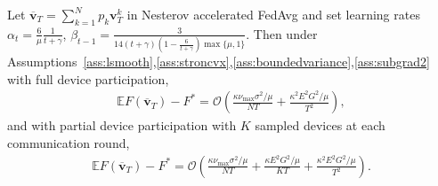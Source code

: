 \begin{thm}
	Let $\overline{\mathbf{v}}_{T}=\sum_{k=1}^{N}p_{k}\mathbf{v}_{T}^{k}$ in Nesterov accelerated FedAvg
	and set learning rates $\alpha_{t}=\frac{6}{\mu}\frac{1}{t+\gamma}$,  $\beta_{t-1}=\frac{3}{14(t+\gamma)(1-\frac{6}{t+\gamma})\max\{\mu,1\}}$. Then under Assumptions~\ref{ass:lsmooth},\ref{ass:stroncvx},\ref{ass:boundedvariance},\ref{ass:subgrad2} with full device participation, 
	\begin{align*}
	\mathbb{E}F(\overline{\mathbf{v}}_{T})-F^{\ast}=\mathcal{O}\left(\frac{\kappa\nu_{\max}\sigma^{2}/\mu}{NT}+\frac{\kappa^{2}E^{2}G^{2}/\mu}{T^{2}}\right),
	\end{align*}
	and with partial device participation with $K$ sampled devices at
	each communication round, 
	{\small
	\begin{align*}
	\mathbb{E}F(\overline{\mathbf{v}}_{T})-F^{\ast}=\mathcal{O}\left(\frac{\kappa\nu_{\max}\sigma^{2}/\mu}{NT}+\frac{\kappa E^{2}G^{2}/\mu}{KT}+\frac{\kappa^{2}E^{2}G^{2}/\mu}{T^{2}}\right).
	\end{align*}}
\end{thm}
%
%
\textbf{}%
\begin{comment}
This implies that $E$ canot be chosen $O(T^{\beta})$ for any $\beta>0$
without degrading the performance. This should be checked in experiments,
whether with partial participation if the communication round is set
to scale with $T$, the convergence deteriorates. This is in constrast
with the full participation case, where $E=O(\sqrt{\frac{T}{N}})$
is allowed. \textbf{If we can confirm that full participation allows
linear speedup with $\nu=N\cdot\max_{k}p_{k}\approx1$ and $E=O(\sqrt{\frac{T}{N}})$,
whereas partial participation only allows $E=O(1)$, then this would
an interesting phenomenon that is not reported by previous studies!}

The convergence result implies that with fixed $E$, as long as \$N\$
satisfies \$E=O(\textbackslash sqrt\{T/N\})\$, there is linear speedup.
When \$N\$ exceeds an upper bound, however, linear speedup may fail
to happen, and \$T/N\$ may remain constant, i.e. the number of iterations
required for convergence may increase with \$N\$. 
\end{comment}


